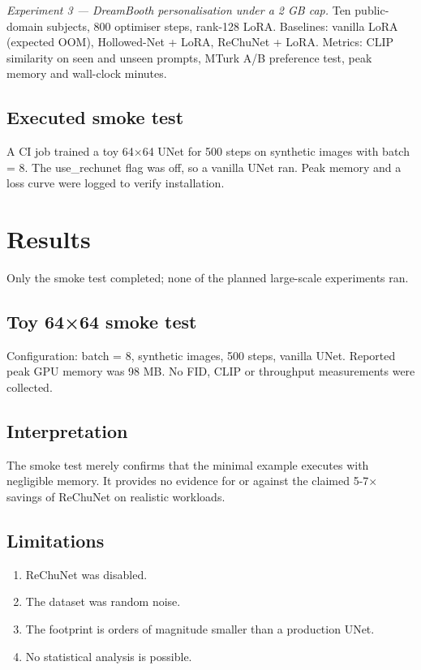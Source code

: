 \documentclass{article}
\begin{document}
\textit{Experiment 3 — DreamBooth personalisation under a 2 GB cap.} Ten public-domain subjects, 800 optimiser steps, rank-128 LoRA. Baselines: vanilla LoRA (expected OOM), Hollowed-Net + LoRA, ReChuNet + LoRA. Metrics: CLIP similarity on seen and unseen prompts, MTurk A/B preference test, peak memory and wall-clock minutes.

\subsection{Executed smoke test}
A CI job trained a toy 64×64 UNet for 500 steps on synthetic images with batch = 8. The use\_rechunet flag was off, so a vanilla UNet ran. Peak memory and a loss curve were logged to verify installation.

\section{Results}
Only the smoke test completed; none of the planned large-scale experiments ran.

\subsection{Toy 64×64 smoke test}
Configuration: batch = 8, synthetic images, 500 steps, vanilla UNet. Reported peak GPU memory was 98 MB. No FID, CLIP or throughput measurements were collected.

\subsection{Interpretation}
The smoke test merely confirms that the minimal example executes with negligible memory. It provides no evidence for or against the claimed 5-7× savings of ReChuNet on realistic workloads.

\subsection{Limitations}
\begin{enumerate}
\item ReChuNet was disabled.
\item The dataset was random noise.
\item The footprint is orders of magnitude smaller than a production UNet.
\item No statistical analysis is possible.
\end{enumerate}
\end{document}
